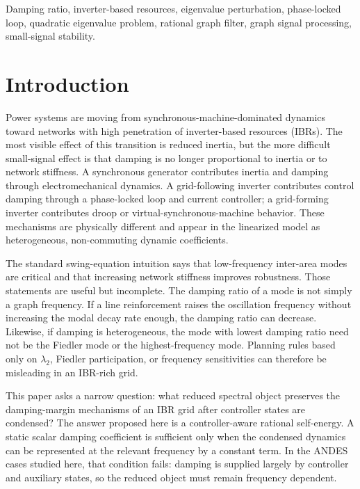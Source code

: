 \documentclass[journal]{IEEEtran}
\begin{document}
\begin{IEEEkeywords}
Damping ratio, inverter-based resources, eigenvalue perturbation, phase-locked loop, quadratic eigenvalue problem, rational graph filter, graph signal processing, small-signal stability.
\end{IEEEkeywords}

\section{Introduction}

Power systems are moving from synchronous-machine-dominated dynamics toward networks with high penetration of inverter-based resources (IBRs). The most visible effect of this transition is reduced inertia, but the more difficult small-signal effect is that damping is no longer proportional to inertia or to network stiffness. A synchronous generator contributes inertia and damping through electromechanical dynamics. A grid-following inverter contributes control damping through a phase-locked loop and current controller; a grid-forming inverter contributes droop or virtual-synchronous-machine behavior. These mechanisms are physically different and appear in the linearized model as heterogeneous, non-commuting dynamic coefficients.

The standard swing-equation intuition says that low-frequency inter-area modes are critical and that increasing network stiffness improves robustness. Those statements are useful but incomplete. The damping ratio of a mode is not simply a graph frequency. If a line reinforcement raises the oscillation frequency without increasing the modal decay rate enough, the damping ratio can decrease. Likewise, if damping is heterogeneous, the mode with lowest damping ratio need not be the Fiedler mode or the highest-frequency mode. Planning rules based only on $\lambda_2$, Fiedler participation, or frequency sensitivities can therefore be misleading in an IBR-rich grid.

This paper asks a narrow question: what reduced spectral object preserves the damping-margin mechanisms of an IBR grid after controller states are condensed? The answer proposed here is a controller-aware rational self-energy. A static scalar damping coefficient is sufficient only when the condensed dynamics can be represented at the relevant frequency by a constant term. In the ANDES cases studied here, that condition fails: damping is supplied largely by controller and auxiliary states, so the reduced object must remain frequency dependent.
\end{document}
